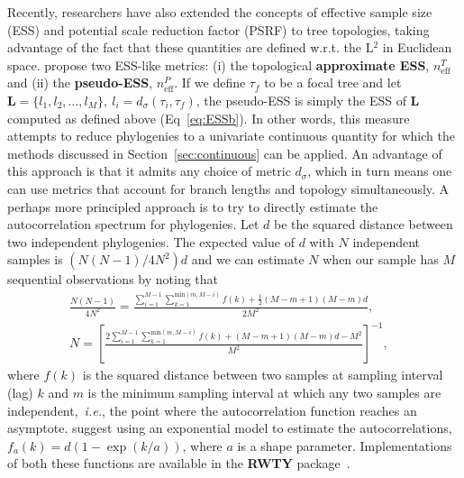 Recently, researchers have also extended the concepts of effective sample size (ESS) and potential scale reduction factor (PSRF) to tree topologies, taking advantage of the fact that these quantities are defined w.r.t. the L$^2$ in Euclidean space.
\cite{Lanfear2016} propose two ESS-like metrics:  (i) the topological \textbf{approximate ESS}, $n_{\text{eff}}^T$ and (ii) the \textbf{pseudo-ESS}, $n_{\text{eff}}^P$.
If we define $\tau_f$ to be a focal tree and let $\boldsymbol L = \{l_1, l_2, \ldots, l_M \}, \: l_i = d_\sigma(\tau_i, \tau_f)$, the pseudo-ESS is simply the ESS of $\boldsymbol L$  computed as defined above (Eq~\ref{eq:ESSb}).
In other words, this measure attempts to reduce phylogenies to a univariate continuous quantity for which the methods discussed in Section~\ref{sec:continuous} can be applied.
An advantage of this approach is that it admits any choice of metric $d_\sigma$, which in turn means one can use metrics that account for branch lengths and topology simultaneously.
A perhaps more principled approach is to try to directly estimate the autocorrelation spectrum for phylogenies.
Let $d$ be the squared distance between two independent phylogenies.
The expected value of $d$ with $N$ independent samples is $(N(N-1)/4N^2)d$ and we can estimate $N$ when our sample has $M$ sequential observations by noting that 
\begin{align}
\label{eq:topoApproxESS}
\frac{N(N-1)}{4N^2} = \frac{\sum_{i = 1}^{M-1} \sum_{k = 1}^{\text{min}(m, M-i)}f(k)  + \frac{1}{2}(M-m + 1)(M-m)d}{2M^2},&\\
N = \left[\frac{2\sum_{i = 1}^{M-1} \sum_{k = 1}^{\text{min}(m, M-i)}f(k)  + (M-m + 1)(M-m)d - M^2}{M^2}\right]^{-1},&
\end{align}
where $f(k)$ is the squared distance between two samples at sampling interval (lag) $k$ and $m$ is the minimum sampling interval at which any two samples are independent,~\textit{i.e.}, the point where the autocorrelation function reaches an asymptote.  
\cite{Lanfear2016} suggest using an exponential model to estimate the autocorrelations, $f_a(k) = d(1-\exp(k/a))$, where $a$ is a shape parameter.
Implementations of both these functions are available in the \textbf{RWTY} package~\citep{Warren2017}.

